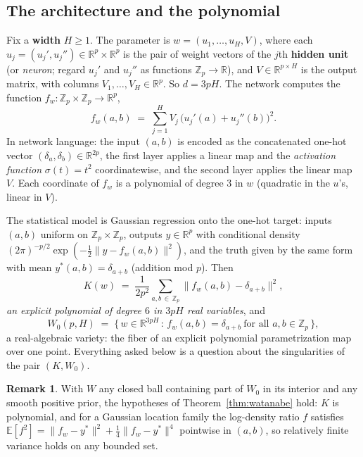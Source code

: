 \documentclass[11pt]{amsart}
\theoremstyle{plain}
\theoremstyle{definition}
\newtheorem{remark}[theorem]{Remark}
\newcommand{\R}{\mathbb{R}}
\newcommand{\Z}{\mathbb{Z}}
\newcommand{\E}{\mathbb{E}}
\begin{document}
\subsection{The architecture and the polynomial}

Fix a \textbf{width} $H \ge 1$. The parameter is $w = (u_1, \dots, u_H, V)$, where each $u_j = (u_j', u_j'') \in \R^p \times \R^p$ is the pair of weight vectors of the $j$th \textbf{hidden unit} (or \emph{neuron}; regard $u_j'$ and $u_j''$ as functions $\Z_p \to \R$), and $V \in \R^{p \times H}$ is the output matrix, with columns $V_1, \dots, V_H \in \R^p$. So $d = 3pH$. The network computes the function $f_w \colon \Z_p \times \Z_p \to \R^p$,
\[
   f_w(a, b) \;=\; \sum_{j=1}^{H} V_j \,\bigl(u_j'(a) + u_j''(b)\bigr)^2 .
\]
In network language: the input $(a,b)$ is encoded as the concatenated one-hot vector $(\delta_a, \delta_b) \in \R^{2p}$, the first layer applies a linear map and the \emph{activation function} $\sigma(t) = t^2$ coordinatewise, and the second layer applies the linear map $V$. Each coordinate of $f_w$ is a polynomial of degree $3$ in $w$ (quadratic in the $u$'s, linear in $V$).

The statistical model is Gaussian regression onto the one-hot target: inputs $(a,b)$ uniform on $\Z_p \times \Z_p$, outputs $y \in \R^p$ with conditional density $ (2\pi)^{-p/2}\exp(-\tfrac12\|y - f_w(a,b)\|^2)$, and the truth given by the same form with mean $y^*(a,b) = \delta_{a+b}$ (addition mod $p$). Then
\begin{equation}\label{eq:K-modadd}
   K(w) \;=\; \frac{1}{2p^2} \sum_{a, b \,\in\, \Z_p} \bigl\| f_w(a,b) - \delta_{a+b} \bigr\|^2 ,
\end{equation}
\emph{an explicit polynomial of degree $6$ in $3pH$ real variables}, and
\[
   W_0(p, H) \;=\; \{\, w \in \R^{3pH} \,:\, f_w(a,b) = \delta_{a+b} \ \text{for all } a, b \in \Z_p \,\},
\]
a real-algebraic variety: the fiber of an explicit polynomial parametrization map over one point. Everything asked below is a question about the singularities of the pair $(K, W_0)$.

\begin{remark}\label{rem:conditions-modadd}
With $W$ any closed ball containing part of $W_0$ in its interior and any smooth positive prior, the hypotheses of Theorem~\ref{thm:watanabe} hold: $K$ is polynomial, and for a Gaussian location family the log-density ratio $f$ satisfies $\E[f^2] = \|f_w - y^*\|^2 + \tfrac14\|f_w - y^*\|^4$ pointwise in $(a,b)$, so relatively finite variance holds on any bounded set.
\end{remark}
\end{document}

